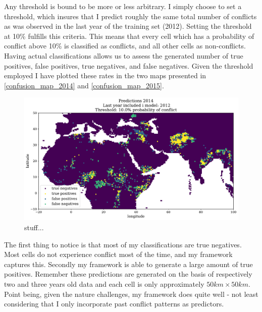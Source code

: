 \documentclass[a4paper]{article}
\begin{document}
Any threshold is bound to be more or less arbitrary. I simply choose to set a threshold, which insures that I predict roughly the same total number of conflicts as was observed in the last year of the training set (2012). Setting the threshold at 10\% fulfills this criteria. This means that every cell which has a probability of conflict above 10\% is classified as conflicts, and all other cells as non-conflicts. Having actual classifications allows us to assess the generated number of true positives, false positives, true negatives, and false negatives. Given the threshold employed I have plotted these rates in the two maps presented in \autoref{confusion_map_2014} and \autoref{confusion_map_2015}.\par

\begin{figure}[!htb]
	\centering
	\includegraphics[scale=0.47]{confusion_map_2014.pdf}
    \caption{\footnotesize{stuff...}}\label{confusion_map_2014}
\end{figure}

The first thing to notice is that most of my classifications are true negatives. Most cells do not experience conflict most of the time, and my framework captures this. Secondly my framework is able to generate a large amount of true positives. Remember these predictions are generated on the basis of respectively two and three years old data and each cell is only approximately $50km\times50km$. Point being, given the nature challenges, my framework does quite well - not least considering that I only incorporate past conflict patterns as predictors.\par
\end{document}
